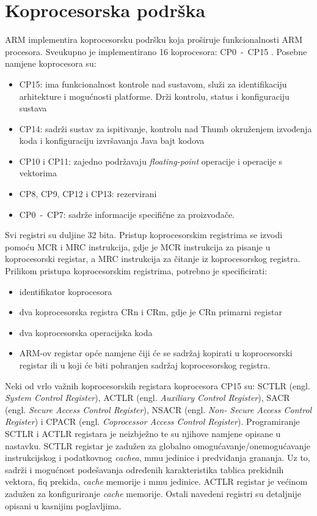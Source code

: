 \documentclass[times, utf8, diplomski, numeric]{fer}
\begin{document}
\section{Koprocesorska podrška}
ARM implementira koprocesorsku podršku koja proširuje funkcionalnosti ARM procesora. Sveukupno je implementirano 16 koprocesora:
CP0~-~CP15 \cite{arch_man}. Posebne namjene koprocesora su:
\begin{itemize}
  \item{CP15: ima funkcionalnost kontrole nad sustavom, služi za identifikaciju arhitekture i mogućnosti platforme. Drži
  kontrolu, status i konfiguraciju sustava}
  \item{CP14: sadrži sustav za ispitivanje, kontrolu nad Thumb okruženjem izvođenja koda i konfiguraciju izvršavanja Java
  bajt kodova}
  \item{CP10 i CP11: zajedno podržavaju \textit{floating-point} operacije i operacije s vektorima}
  \item{CP8, CP9, CP12 i CP13: rezervirani}
  \item{CP0~-~CP7: sadrže informacije specifične za proizvođače.}
\end{itemize}
Svi registri su duljine 32 bita. Pristup koprocesorskim registrima se izvodi pomoću MCR i MRC instrukcija, gdje je MCR
instrukcija za pisanje u koprocesorski registar, a MRC instrukcija za čitanje iz koprocesorskog registra.
Prilikom pristupa koprocesorskim registrima, potrebno je specificirati:
\begin{itemize}
  \item{identifikator koprocesora}
  \item{dva koprocesorska registra CRn i CRm, gdje je CRn primarni registar}
  \item{dva koprocesorska operacijska koda}
  \item{ARM-ov registar opće namjene čiji će se sadržaj kopirati u koprocesorski registar ili u koji će biti pohranjen
  sadržaj koprocesorskog registra.}
\end{itemize}
Neki od vrlo važnih koprocesorskih registara koprocesora CP15 su: SCTLR (engl. \textit{System Control Register}), ACTLR
(engl. \textit{Auxiliary Control Register}), SACR (engl. \textit{Secure Access Control Register}), NSACR (engl. \textit{Non-
Secure Access Control Register}) i CPACR (engl. \textit{Coprocessor Access Control Register}). Programiranje SCTLR i ACTLR
registara je neizbježno te su njihove namjene opisane u nastavku. SCTLR registar je zadužen za globalno
omogućavanje/onemogućavanje instrukcijskog i podatkovnog \textit{cachea}, \gls{mmu} jedinice i predviđanja grananja. Uz to, sadrži
i mogućnost podešavanja određenih karakteristika tablica prekidnih vektora, \gls{fiq} prekida, \textit{cache} memorije i \gls{mmu} jedinice.
ACTLR registar je većinom zadužen za konfiguriranje \textit{cache} memorije. Ostali navedeni registri su detaljnije opisani u
kasnijim poglavljima.
\end{document}
